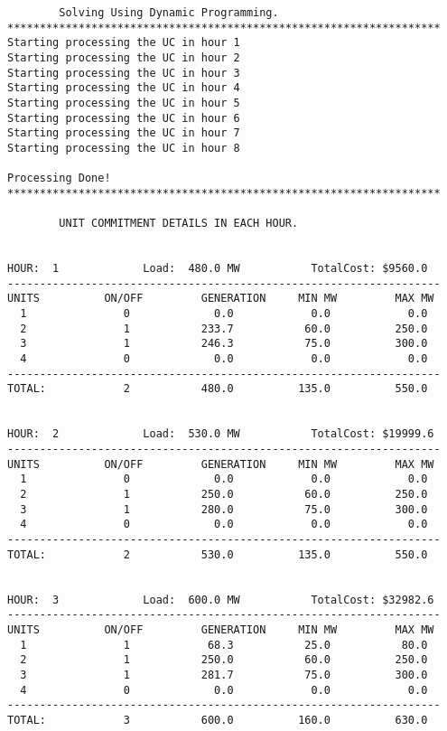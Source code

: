 \begin{verbatim}
		Solving Using Dynamic Programming.
*******************************************************************
Starting processing the UC in hour 1
Starting processing the UC in hour 2
Starting processing the UC in hour 3
Starting processing the UC in hour 4
Starting processing the UC in hour 5
Starting processing the UC in hour 6
Starting processing the UC in hour 7
Starting processing the UC in hour 8

Processing Done!
*******************************************************************

		UNIT COMMITMENT DETAILS IN EACH HOUR.


HOUR:  1             Load:  480.0 MW           TotalCost: $9560.0
-------------------------------------------------------------------
UNITS          ON/OFF         GENERATION     MIN MW         MAX MW
  1               0             0.0            0.0            0.0
  2               1           233.7           60.0          250.0
  3               1           246.3           75.0          300.0
  4               0             0.0            0.0            0.0
-------------------------------------------------------------------
TOTAL:            2           480.0          135.0          550.0


HOUR:  2             Load:  530.0 MW           TotalCost: $19999.6
-------------------------------------------------------------------
UNITS          ON/OFF         GENERATION     MIN MW         MAX MW
  1               0             0.0            0.0            0.0
  2               1           250.0           60.0          250.0
  3               1           280.0           75.0          300.0
  4               0             0.0            0.0            0.0
-------------------------------------------------------------------
TOTAL:            2           530.0          135.0          550.0


HOUR:  3             Load:  600.0 MW           TotalCost: $32982.6
-------------------------------------------------------------------
UNITS          ON/OFF         GENERATION     MIN MW         MAX MW
  1               1            68.3           25.0           80.0
  2               1           250.0           60.0          250.0
  3               1           281.7           75.0          300.0
  4               0             0.0            0.0            0.0
-------------------------------------------------------------------
TOTAL:            3           600.0          160.0          630.0



\end{verbatim}
